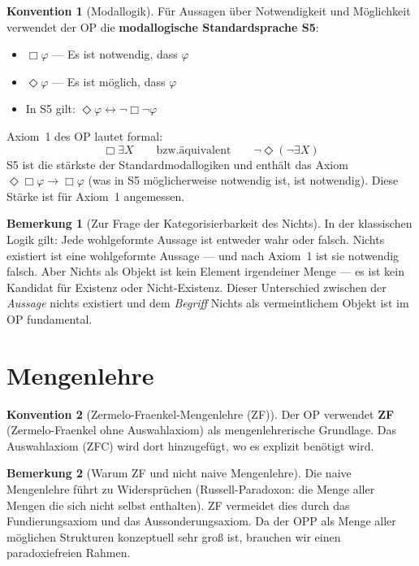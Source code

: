\documentclass[11pt,a4paper]{article}
\theoremstyle{plain}
\theoremstyle{definition}
\newtheorem{remark}{Bemerkung}[section]
\newtheorem{konvention}{Konvention}[section]
\begin{document}
\begin{konvention}[Modallogik]
F\"{u}r Aussagen \"{u}ber Notwendigkeit und M\"{o}glichkeit verwendet der OP die
\textbf{modallogische Standardsprache S5}:
\begin{itemize}
  \item $\Box \varphi$ --- \glqq{}Es ist notwendig, dass $\varphi$\grqq{}
  \item $\Diamond \varphi$ --- \glqq{}Es ist m\"{o}glich, dass $\varphi$\grqq{}
  \item In S5 gilt: $\Diamond \varphi \leftrightarrow \neg\Box\neg\varphi$
\end{itemize}
Axiom~1 des OP lautet formal:
\[
  \Box\exists X \qquad \text{bzw.\"{a}quivalent} \qquad \neg\Diamond(\neg\exists X)
\]
S5 ist die st\"{a}rkste der Standardmodallogiken und enth\"{a}lt das Axiom
$\Diamond\Box\varphi \rightarrow \Box\varphi$ (was in S5 m\"{o}glicherweise notwendig
ist, ist notwendig). Diese St\"{a}rke ist f\"{u}r Axiom~1 angemessen.
\end{konvention}

\begin{remark}[Zur Frage der Kategorisierbarkeit des Nichts]
In der klassischen Logik gilt: Jede wohlgeformte Aussage ist entweder wahr oder
falsch. \glqq{}Nichts existiert\grqq{} ist eine wohlgeformte Aussage --- und nach
Axiom~1 ist sie notwendig falsch. Aber \glqq{}Nichts\grqq{} als Objekt ist kein
Element irgendeiner Menge --- es ist kein Kandidat f\"{u}r Existenz oder
Nicht-Existenz. Dieser Unterschied zwischen der \emph{Aussage} \glqq{}nichts
existiert\grqq{} und dem \emph{Begriff} \glqq{}Nichts\grqq{} als vermeintlichem
Objekt ist im OP fundamental.
\end{remark}

\section{Mengenlehre}

\begin{konvention}[Zermelo-Fraenkel-Mengenlehre (ZF)]
Der OP verwendet \textbf{ZF} (Zermelo-Fraenkel ohne Auswahlaxiom) als
mengenlehre\-rische Grundlage. Das Auswahlaxiom (ZFC) wird dort hinzugef\"{u}gt,
wo es explizit ben\"{o}tigt wird.
\end{konvention}

\begin{remark}[Warum ZF und nicht naive Mengenlehre]
Die naive Mengenlehre f\"{u}hrt zu Widerspr\"{u}chen (Russell-Paradoxon: die Menge
aller Mengen die sich nicht selbst enthalten). ZF vermeidet dies durch das
Fundierungsaxiom und das Aussonderungsaxiom. Da der OPP als Menge aller m\"{o}glichen
Strukturen konzeptuell sehr gro\ss{} ist, brauchen wir einen paradoxiefreien Rahmen.
\end{remark}
\end{document}
